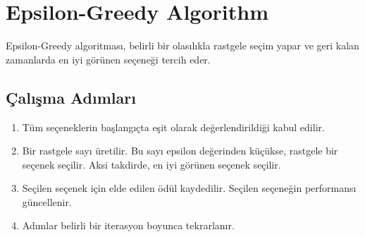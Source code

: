 \section{Epsilon-Greedy Algorithm}

Epsilon-Greedy algoritması, belirli bir olasılıkla rastgele seçim yapar ve geri kalan zamanlarda en iyi görünen seçeneği tercih eder. 

\subsection{Çalışma Adımları}

\begin{enumerate}
	\item Tüm seçeneklerin başlangıçta eşit olarak değerlendirildiği kabul edilir.
	\item Bir rastgele sayı üretilir. Bu sayı epsilon değerinden küçükse, rastgele bir seçenek seçilir. Aksi takdirde, en iyi görünen seçenek seçilir.
	\item Seçilen seçenek için elde edilen ödül kaydedilir. Seçilen seçeneğin performansı güncellenir.
	\item Adımlar belirli bir iterasyon boyunca tekrarlanır.
\end{enumerate}

\newpage